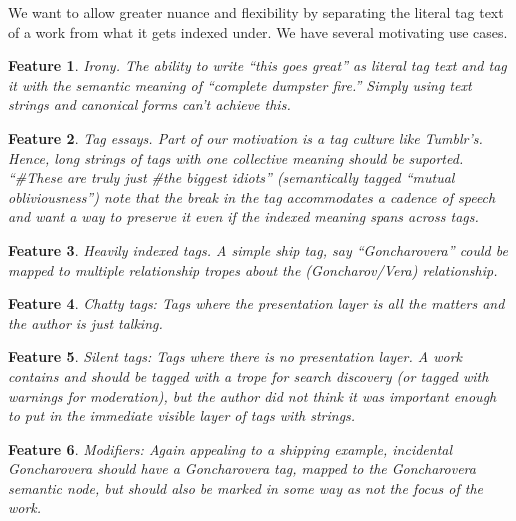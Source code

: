 \documentclass{amsart}
\newtheorem*{feat}{Problem}
\newtheorem*{feat}{Feature}
\theoremstyle{remark}
\begin{document}
We want to allow greater nuance and flexibility by separating the literal tag text of a work from what it gets indexed under. We have several motivating use cases. 

\begin{feat}Irony. The ability to write ``this goes great'' as literal tag text and tag it with the semantic meaning of ``complete dumpster fire.'' Simply using text strings and canonical forms can't achieve this. 
\end{feat}

\begin{feat}Tag essays. Part of our motivation is a tag culture like Tumblr's. Hence, long strings of tags with one collective meaning should be suported. ``#These are truly just #the biggest idiots'' (semantically tagged ``mutual obliviousness'') note that the break in the tag accommodates a cadence of speech and want a way to preserve it even if the indexed meaning spans across tags. 
\end{feat}

\begin{feat}Heavily indexed tags. A simple ship tag, say ``Goncharovera'' could be mapped to multiple relationship tropes about the (Goncharov/Vera) relationship.\end{feat}

\begin{feat}Chatty tags: Tags where the presentation layer is all the matters and the author is just talking.\end{feat}

\begin{feat}Silent tags: Tags where there is no presentation layer. A work contains and should be tagged with a trope for search discovery (or tagged with warnings for moderation), but the author did not think it was important enough to put in the immediate visible layer of tags with strings.\end{feat}

\begin{feat}Modifiers: Again appealing to a shipping example, incidental Goncharovera should have a Goncharovera tag, mapped to the Goncharovera semantic node, but should also be marked in some way as not the focus of the work.\end{feat} 
\end{document}
